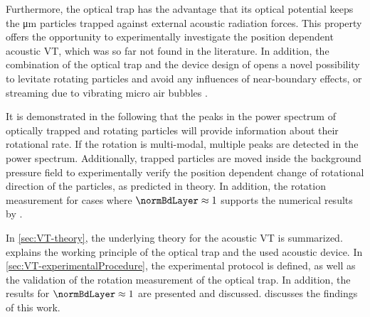 Furthermore, the optical trap has the advantage that its optical potential keeps 
the \si{\micro\meter} particles trapped against external acoustic radiation 
forces. This property offers the opportunity to experimentally investigate the 
position dependent acoustic VT, which was so far not found in the literature.  
In addition, the combination of the optical trap and the device design of 
\citeauthor{Schwarz} \cite{Schwarz} opens a novel possibility to levitate 
rotating particles and avoid any influences of near-boundary effects, or 
streaming due to vibrating micro air bubbles \cite{Lamprecht}.

It is demonstrated in the following that the peaks in the power spectrum of 
optically trapped and rotating particles will provide information about their 
rotational rate. If the rotation is multi-modal, multiple peaks are detected in 
the power spectrum. Additionally, trapped particles are moved inside the 
background pressure field to experimentally verify the position dependent change 
of rotational direction of the particles, as predicted in theory. In addition, 
the rotation measurement for cases where $\normBdLayer \approx 1$ supports the 
numerical results by \citeauthor{hahn2016}.

In \cref{sec:VT-theory}, the underlying theory for the acoustic VT is summarized.  
 explains the working principle of the optical trap 
and the used acoustic device. In \cref{sec:VT-experimentalProcedure}, the 
experimental protocol is defined, as well as the validation of the rotation 
measurement of the optical trap. In addition, the results for $\normBdLayer 
\approx 1$ are presented and discussed.  discusses the 
findings of this work.
